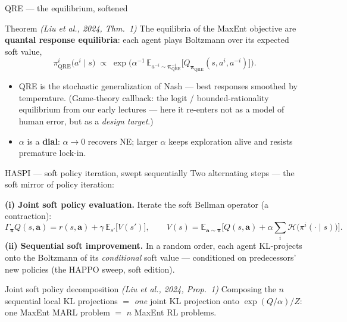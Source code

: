 \documentclass[10pt, aspectratio=169]{beamer}
\newcommand{\paper}[1]{\textcolor{mLightBrown}{\small\textit{(#1)}}}
\begin{document}
\begin{frame}{QRE --- the equilibrium, softened}
\begin{block}{Theorem \hfill {\scriptsize\normalfont\paper{Liu et al., 2024, Thm.\ 1}}}
\centering
The equilibria of the MaxEnt objective are \textbf{quantal response equilibria}: each agent plays Boltzmann over its expected soft value,
\[
\pi^{i}_{\mathrm{QRE}}\big(a^i \mid s\big) \;\propto\; \exp\!\Big( \alpha^{-1}\, \mathbb{E}_{a^{-i}\sim \bm\pi^{-i}_{\mathrm{QRE}}}\big[ Q_{\bm\pi_{\mathrm{QRE}}}(s, a^i, a^{-i}) \big] \Big).
\]
\end{block}
\medskip

\begin{itemize}\setlength\itemsep{2pt}
\item QRE is the \alert{stochastic generalization of Nash} --- best responses smoothed by temperature. {\footnotesize\textcolor{mLightBrown}{(Game-theory callback: the logit / bounded-rationality equilibrium from our early lectures --- here it re-enters not as a model of human error, but as a \emph{design target}.)}}
\item $\alpha$ is a \textbf{dial}: $\alpha\!\to\!0$ recovers NE; larger $\alpha$ keeps exploration alive and resists premature lock-in.
\end{itemize}
\end{frame}

\begin{frame}{HASPI --- soft policy iteration, swept sequentially}
Two alternating steps --- the soft mirror of policy iteration:
\medskip

\textbf{(i) Joint soft policy evaluation.} Iterate the soft Bellman operator (a contraction):
\[
\Gamma_{\bm\pi} Q(s,\mathbf{a}) = r(s,\mathbf{a}) + \gamma\,\mathbb{E}_{s'}\big[ V(s') \big],
\qquad
V(s) = \mathbb{E}_{\mathbf{a}\sim\bm\pi}\Big[ Q(s,\mathbf{a}) + \alpha\textstyle\sum_i \mathcal{H}\big(\pi^i(\cdot\mid s)\big) \Big].
\]
\pause
\textbf{(ii) Sequential soft improvement.} In a random order, each agent KL-projects onto the Boltzmann of its \emph{conditional} soft value --- conditioned on predecessors' \alert{new} policies (the HAPPO sweep, soft edition).
\medskip
\pause
\begin{block}{Joint soft policy decomposition \hfill {\scriptsize\normalfont\paper{Liu et al., 2024, Prop.\ 1}}}
\centering
Composing the $n$ sequential local KL projections $=$ \emph{one} joint KL projection onto $\exp(Q/\alpha)/Z$:
\quad \alert{one MaxEnt MARL problem $=$ $n$ MaxEnt RL problems.}
\end{block}
\end{frame}
\end{document}
